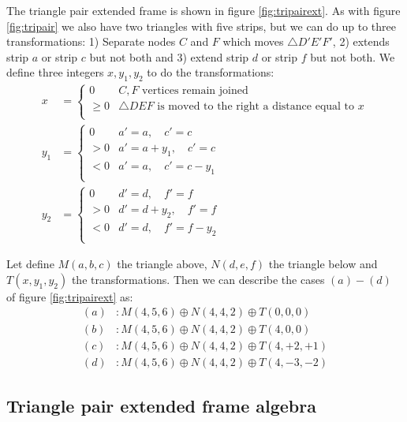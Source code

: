 \documentclass[11pt]{article}
\begin{document}
The triangle pair extended frame is shown in figure \ref{fig:tripairext}.
As with figure \ref{fig:tripair} we also have two triangles with five strips,
but we can do up to three transformations: 
1) Separate nodes $C$ and $F$ which moves $\triangle{D'E'F'}$, 2) extends strip $a$ or strip $c$ but not both and 3) extend strip $d$ or strip $f$ but not both.
We define three integers $x, y_1, y_2$ to do the transformations:
\begin{align}
x &= \left \{ \begin{array}{rl}
 0       &  C,F \mbox{ vertices remain joined}\\
 \geq  0 &  \triangle{DEF} \mbox{ is moved to the right a distance equal to } x \\
 \end{array}\right. \\
y_1 &= \left \{ \begin{array}{rl}
 0   & a' = a,\quad c' = c \\
 > 0 & a' = a + y_1,\quad c' = c \\
 < 0 & a' = a,\quad c' = c - y_1 \\
 \end{array}\right. \\ 
y_2 &= \left \{ \begin{array}{rl}
 0   & d' = d,\quad f' = f \\
 > 0 & d' = d + y_2,\quad f' = f \\
 < 0 & d' = d,\quad f' = f - y_2 \\
 \end{array}\right. 
\end{align}

Let define $M(a,b,c)$ the triangle above, $N(d,e,f)$ the triangle below and $T(x,y_1,y_2)$ the transformations.
Then we can describe the cases $(a)-(d)$ of figure \ref{fig:tripairext} as:
\begin{align*}
(a) &: M(4,5,6) \oplus N(4,4,2) \oplus T(0,0,0) \\
(b) &: M(4,5,6) \oplus N(4,4,2) \oplus T(4,0,0) \\
(c) &: M(4,5,6) \oplus N(4,4,2) \oplus T(4,+2,+1) \\
(d) &: M(4,5,6) \oplus N(4,4,2) \oplus T(4,-3,-2)
\end{align*}

\subsection{Triangle pair extended frame algebra}
\end{document}
